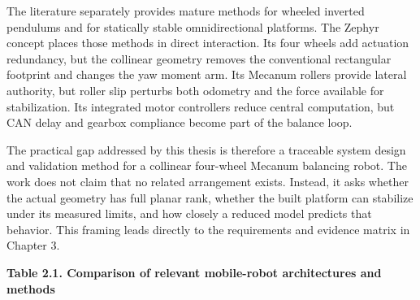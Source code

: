 The literature separately provides mature methods for wheeled inverted
pendulums and for statically stable omnidirectional platforms. The
Zephyr concept places those methods in direct interaction. Its four
wheels add actuation redundancy, but the collinear geometry removes the
conventional rectangular footprint and changes the yaw moment arm. Its
Mecanum rollers provide lateral authority, but roller slip perturbs both
odometry and the force available for stabilization. Its integrated motor
controllers reduce central computation, but CAN delay and gearbox
compliance become part of the balance loop.

The practical gap addressed by this thesis is therefore a traceable
system design and validation method for a collinear four-wheel Mecanum
balancing robot. The work does not claim that no related arrangement
exists. Instead, it asks whether the actual geometry has full planar
rank, whether the built platform can stabilize under its measured
limits, and how closely a reduced model predicts that behavior. This
framing leads directly to the requirements and evidence matrix in
Chapter 3.

\par\medskip\noindent\singlespacing
{}
\textbf{Table 2.1. Comparison of relevant mobile-robot architectures and methods}\par

